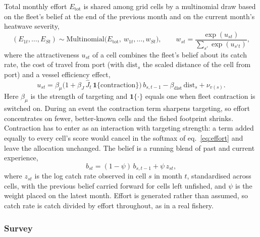 \documentclass[11pt,a4paper]{article}
\newcommand{\vt}[1]{\text{#1}}
\begin{document}
Total monthly effort $E_{\vt{tot}}$ is shared among grid cells by a multinomial draw based on the fleet's belief at the end of the previous month and on the current month's heatwave severity,
\begin{equation}
(E_{1t},\dots,E_{St}) \sim \vt{Multinomial}\big(E_{\vt{tot}},\ w_{1t},\dots,w_{St}\big), \qquad w_{st} = \frac{\exp(u_{st})}{\sum_{s'}\exp(u_{s't})},
\label{eq:effort}
\end{equation}
where the attractiveness $u_{st}$ of a cell combines the fleet's belief about its catch rate, the cost of travel from port (with $\vt{dist}_s$ the scaled distance of the cell from port) and a vessel efficiency effect,
\begin{equation}
u_{st} = \beta_\mu\big(1+\beta_J\,\hat J_t\,\mathbf{1}\{\vt{contraction}\}\big)\,b_{s,t-1} - \beta_{\vt{dist}}\,\vt{dist}_s + \nu_{v(s)} .
\label{eq:score}
\end{equation}
Here $\beta_\mu$ is the strength of targeting and $\mathbf{1}\{\cdot\}$ equals one when fleet contraction is switched on. During an event the contraction term sharpens targeting, so effort concentrates on fewer, better-known cells and the fished footprint shrinks. Contraction has to enter as an interaction with targeting strength: a term added equally to every cell's score would cancel in the softmax of eq.~\eqref{eq:effort} and leave the allocation unchanged. The belief is a running blend of past and current experience,
\begin{equation}
b_{st} = (1-\psi)\,b_{s,t-1} + \psi\,z_{st},
\label{eq:belief}
\end{equation}
where $z_{st}$ is the log catch rate observed in cell $s$ in month $t$, standardised across cells, with the previous belief carried forward for cells left unfished, and $\psi$ is the weight placed on the latest month. Effort is generated rather than assumed, so catch rate is catch divided by effort throughout, as in a real fishery.

\subsubsection{Survey}
\end{document}
